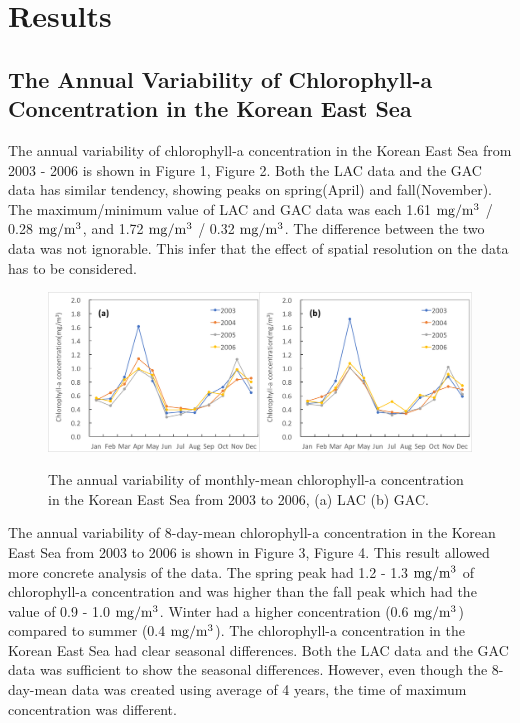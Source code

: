 
\section{Results}
 
\subsection{The Annual Variability of Chlorophyll-a Concentration in the Korean East Sea}
 
The annual variability of chlorophyll-a concentration in the Korean East Sea from 2003 - 2006 is shown in Figure 1, Figure 2. Both the LAC data and the GAC data has similar tendency, showing peaks on spring(April) and fall(November). The maximum/minimum value of LAC and GAC data was each 1.61 $\rm mg/m^3$ / 0.28 $\rm mg/m^3$, and 1.72 $\rm mg/m^3$ / 0.32 $\rm mg/m^3$. The difference between the two data was not ignorable. This infer that the effect of spatial resolution on the data has to be considered.
   
 \begin{figure}[b]
 	\centering
 	\includegraphics[width=1.0\linewidth]{../images/annualmon}\\
 	\caption{The annual variability of monthly-mean chlorophyll-a concentration in the Korean East Sea from 2003 to 2006, (a) LAC (b) GAC.}
 	\label{fig:annualmon}
 \end{figure}
 
The annual variability of 8-day-mean chlorophyll-a concentration in the Korean East Sea from 2003 to 2006 is shown in Figure 3, Figure 4. This result allowed more concrete analysis of the data. The spring peak had 1.2 - 1.3 $\rm mg/m^3$ of chlorophyll-a concentration and was higher than the fall peak which had the value of 0.9 - 1.0 $\rm mg/m^3$. Winter had a higher concentration (0.6 $\rm mg/m^3$) compared to summer (0.4 $\rm mg/m^3$). The chlorophyll-a concentration in the Korean East Sea had clear seasonal differences. Both the LAC data and the GAC data was sufficient to show the seasonal differences. However, even though the 8-day-mean data was created using average of 4 years, the time of maximum concentration was different. 

